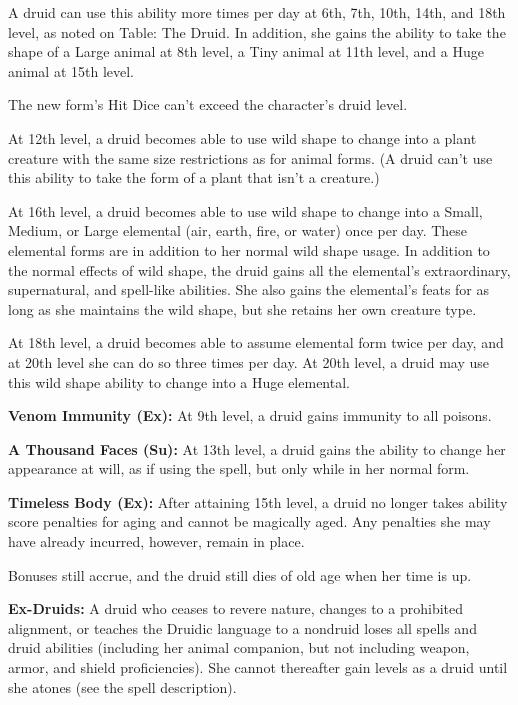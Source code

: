 A druid can use this ability more times per day at 6th, 7th, 10th, 14th, and 18th level, as noted on Table: The Druid. In addition, she gains the ability to take the shape of a Large animal at 8th level, a Tiny animal at 11th level, and a Huge animal at 15th level.

The new form's Hit Dice can't exceed the character's druid level.

At 12th level, a druid becomes able to use wild shape to change into a plant creature with the same size restrictions as for animal forms. (A druid can't use this ability to take the form of a plant that isn't a creature.)

At 16th level, a druid becomes able to use wild shape to change into a Small, Medium, or Large elemental (air, earth, fire, or water) once per day. These elemental forms are in addition to her normal wild shape usage. In addition to the normal effects of wild shape, the druid gains all the elemental's extraordinary, supernatural, and spell-like abilities. She also gains the elemental's feats for as long as she maintains the wild shape, but she retains her own creature type.

At 18th level, a druid becomes able to assume elemental form twice per day, and at 20th level she can do so three times per day. At 20th level, a druid may use this wild shape ability to change into a Huge elemental.

\textbf{Venom Immunity (Ex):} At 9th level, a druid gains immunity to all poisons. 

\textbf{A Thousand Faces (Su):} At 13th level, a druid gains the ability to change her appearance at will, as if using the  spell, but only while in her normal form.

\textbf{Timeless Body (Ex):} After attaining 15th level, a druid no longer takes ability score penalties for aging and cannot be magically aged. Any penalties she may have already incurred, however, remain in place.

Bonuses still accrue, and the druid still dies of old age when her time is up.

\textbf{Ex-Druids:} A druid who ceases to revere nature, changes to a prohibited alignment, or teaches the Druidic language to a nondruid loses all spells and druid abilities (including her animal companion, but not including weapon, armor, and shield proficiencies). She cannot thereafter gain levels as a druid until she atones (see the  spell description).

